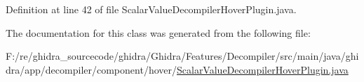 Definition at line 42 of file Scalar\+Value\+Decompiler\+Hover\+Plugin.\+java.



The documentation for this class was generated from the following file\+:\begin{DoxyCompactItemize}
\item 
F\+:/re/ghidra\+\_\+sourcecode/ghidra/\+Ghidra/\+Features/\+Decompiler/src/main/java/ghidra/app/decompiler/component/hover/\mbox{\hyperlink{_scalar_value_decompiler_hover_plugin_8java}{Scalar\+Value\+Decompiler\+Hover\+Plugin.\+java}}\end{DoxyCompactItemize}
